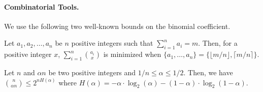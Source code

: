 \paragraph{Combinatorial Tools.} We use the following two well-known bounds on the binomial coefficient.


\begin{proposition}\label{prop:bionomila-minimize}
Let $a_1, a_2, \ldots, a_n$ be $n$ positive integers such that $\sum_{i = 1}^n a_i = m$. Then, for a positive integer $x$,  $\sum_{i=1}^n {a_i \choose x}$ is minimized when $\{a_1,\ldots, a_n\} = \{\lfloor m/n \rfloor , \lceil m/n \rceil\}$.
\end{proposition}


\begin{proposition}\label{prop:entropy-approximation}
Let $n$ and $\alpha n$ be two positive integers and $1/n \leq \alpha \leq 1/2$. Then, we have ${n \choose \alpha n} \leq 2^{nH(\alpha)}$ where $H(\alpha) = -\alpha \cdot \log_2(\alpha) - (1-\alpha) \cdot \log_2 (1 - \alpha)$.
\end{proposition}